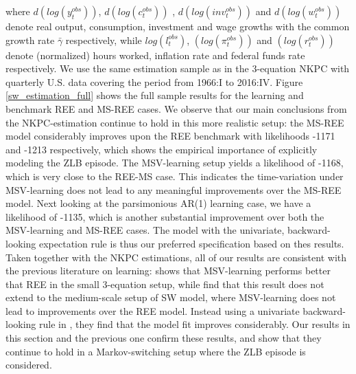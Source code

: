 \documentclass[12pt,reqno]{article}
\numberwithin{equation}{section}
\begin{document}
where $ d( log(y^{obs}_t)) $, $ d(log(c^{obs}_t)) $ , $ d(log({inv}^{obs}_t)) $ and $d(log(w^{obs}_t)) $ denote real output, consumption, investment and wage growths with the common growth rate $\bar{\gamma}$ respectively, while $log(l^{obs}_t)$, $(log(\pi^{obs}_t)) $ and $(log(r^{obs}_t)) $ denote (normalized) hours worked, inflation rate and federal funds rate respectively. We use the same estimation sample as in the 3-equation NKPC with quarterly U.S. data covering the period from 1966:I to 2016:IV. 
 Figure \ref{sw_estimation_full} shows the full sample results for the learning and benchmark REE and MS-REE cases. We observe that our main conclusions from the NKPC-estimation continue to hold in this more realistic setup: the MS-REE model considerably improves upon the REE benchmark with likelihoods -1171 and -1213 respectively, which shows the empirical importance of explicitly modeling the ZLB episode. The MSV-learning setup yields a likelihood of -1168, which is very close to the REE-MS case. This indicates the time-variation under MSV-learning does not lead to any meaningful improvements over the MS-REE model. Next looking at the parsimonious AR(1) learning case, we have a likelihood of -1135, which is another substantial improvement over both the MSV-learning and MS-REE cases. The model with the univariate, backward-looking expectation rule is thus our preferred specification based on thes results. Taken together with the NKPC estimations, all of our results are consistent with the previous literature on learning: \cite{milani2007expectations} shows that MSV-learning performs better that REE in the small 3-equation setup, while \cite{slobodyan2012alearning} find that this result does not extend to the medium-scale setup of SW model, where MSV-learning does not lead to improvements over the REE model. Instead using a univariate backward-looking rule in \cite{slobodyan2012blearning}, they find that the model fit improves considerably. Our results in this section and the previous one confirm these results, and show that they continue to hold in a Markov-switching setup where the ZLB episode is considered. \\
\noindent
\end{document}
